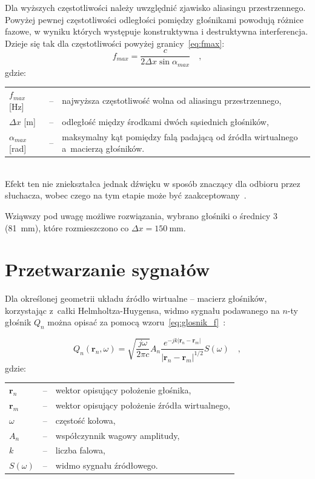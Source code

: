 \documentclass[12pt]{oska}
\let\Oldsection\section
\renewcommand{\section}{\FloatBarrier\Oldsection}
\begin{document}
Dla wyższych częstotliwości należy
uwzględnić zjawisko aliasingu przestrzennego. Powyżej pewnej częstotliwości
odległości pomiędzy głośnikami powodują różnice fazowe, w wyniku których występuje
konstruktywna i destruktywna interferencja. Dzieje się tak dla częstotliwości
powyżej granicy~\eqref{eq:fmax}:
\begin{equation}
  f_{max}=\frac{c}{2\Delta x \sin{\alpha_{max}}} \quad, \label{eq:fmax}
\end{equation}
gdzie:\\
	\indent \begin{tabular}{l c p{}}
			$f_{max}$ [\si{\hertz}] & -- & najwyższa częstotliwość wolna od aliasingu przestrzennego, \\
			$\Delta x$ [\si{\metre}] & -- & odległość między środkami dwóch sąsiednich głośników, \\
				$\alpha_{max}$ [\si{\radian}] & -- & maksymalny kąt pomiędzy falą padającą od źródła wirtualnego a~macierzą głośników.\\
			\end{tabular}\\
		
Efekt ten nie zniekształca jednak dźwięku w sposób znaczący dla odbioru przez słuchacza,
wobec czego na tym etapie może być zaakceptowany~\cite{hq_rendering}.

Wziąwszy pod uwagę możliwe rozwiązania, wybrano głośniki o średnicy \SI{3}{\inch}
(\SI{81}{\milli\meter}), które rozmieszczono co
$\Delta x=\SI{150}{\milli\meter}$.

\section{Przetwarzanie sygnałów}\label{s:algorithm}

Dla określonej geometrii układu źródło wirtualne -- macierz głośników, korzystając z~całki Helmholtza-Huygensa,
widmo sygnału podawanego na $n$-ty głośnik $Q_n$ można opisać za pomocą
wzoru~\eqref{eq:glosnik_f}~\cite{delay}:

\begin{equation}
  Q_n(\bm{r}_n,\omega) = \sqrt{\frac{j\omega}{2\pi c}} A_n \frac {e^{-jk|\bm{r}_n-\bm{r}_m|}}{|\bm{r}_n-\bm{r}_m|^{1/2}} S(\omega) \quad,
  \label{eq:glosnik_f}
\end{equation}
gdzie:\\
	\indent \begin{tabular}{l c p{}}
				$\bm{r}_n$ & -- & wektor opisujący położenie głośnika, \\
				$\bm{r}_m$ & -- & wektor opisujący położenie źródła wirtualnego,\\
				$\omega$ & -- & częstość kołowa, \\
				$A_n$ & -- & współczynnik wagowy amplitudy,\\
				$k$ & -- & liczba falowa,\\
				$S(\omega)$ & -- & widmo sygnału źródłowego.
			\end{tabular}\\
\end{document}
